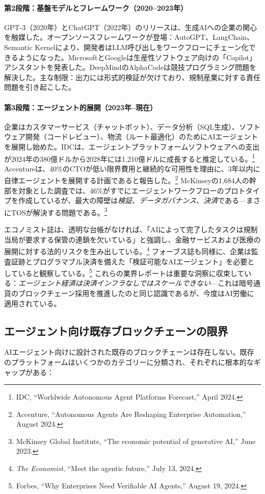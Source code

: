 \documentclass[11pt]{article}
\begin{document}
\paragraph{第2段階：基盤モデルとフレームワーク（2020--2023年）} GPT-3（2020年）とChatGPT（2022年）のリリースは、生成AIへの企業の関心を触媒した。オープンソースフレームワークが登場：AutoGPT、LangChain、Semantic Kernelにより、開発者はLLM呼び出しをワークフローにチェーン化できるようになった。MicrosoftとGoogleは生産性ソフトウェア向けの「Copilot」アシスタントを発表した。DeepMindのAlphaCodeは競技プログラミング問題を解決した。主な制限：出力には形式的検証が欠けており、規制産業に対する責任問題を引き起こした。

\paragraph{第3段階：エージェント的展開（2023年--現在）} 企業はカスタマーサービス（チャットボット）、データ分析（SQL生成）、ソフトウェア開発（コードレビュー）、物流（ルート最適化）のためにAIエージェントを展開し始めた。IDCは、エージェントプラットフォームソフトウェアへの支出が2024年の380億ドルから2028年には1,210億ドルに成長すると推定している。\footnote{IDC, ``Worldwide Autonomous Agent Platforms Forecast,'' April 2024.} Accentureは、40\%のCTOが低い限界費用と継続的な可用性を理由に、3年以内に自律エージェントを展開する計画であると報告した。\footnote{Accenture, ``Autonomous Agents Are Reshaping Enterprise Automation,'' August 2024.} McKinseyの1,684人の幹部を対象とした調査では、46\%がすでにエージェントワークフローのプロトタイプを作成しているが、最大の障壁は\emph{検証}、\emph{データガバナンス}、\emph{決済}である---まさにTOSが解決する問題である。\footnote{McKinsey Global Institute, ``The economic potential of generative AI,'' June 2023.}

エコノミスト誌は、透明な台帳がなければ、「AIによって完了したタスクは規制当局が要求する保管の連鎖を欠いている」と強調し、金融サービスおよび医療の展開に対する法的リスクを生み出している。\footnote{\emph{The Economist}, ``Meet the agentic future,'' July 13, 2024.} フォーブス誌も同様に、企業は監査証跡とプログラマブル決済を備えた「検証可能なAIエージェント」を必要としていると観察している。\footnote{Forbes, ``Why Enterprises Need Verifiable AI Agents,'' August 19, 2024.} これらの業界レポートは重要な洞察に収束している：\emph{エージェント経済は決済インフラなしではスケールできない}---これは暗号通貨のブロックチェーン採用を推進したのと同じ認識であるが、今度はAI労働に適用されている。

\subsection{エージェント向け既存ブロックチェーンの限界}
AIエージェント向けに設計された既存のブロックチェーンは存在しない。既存のプラットフォームはいくつかのカテゴリーに分類され、それぞれに根本的なギャップがある：
\end{document}
